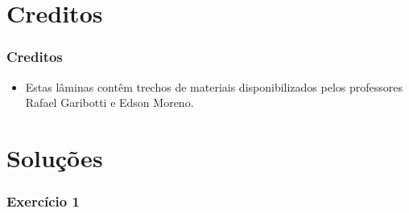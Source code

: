 \documentclass[aspectratio=169]{beamer}
\begin{document}
\section{Creditos}

\begin{frame}\frametitle{Creditos}
\begin{itemize}
	\item Estas lâminas contêm trechos de materiais disponibilizados pelos professores Rafael Garibotti e Edson Moreno.
\end{itemize}
\end{frame}

\section{Soluções}

\begin{frame}\frametitle{Exercício 1}
\begin{columns}
\begin{column}{0.5\linewidth}

\end{column}
\begin{column}{0.5\linewidth}

\end{column}
\end{columns}
\end{frame}

\end{document}
